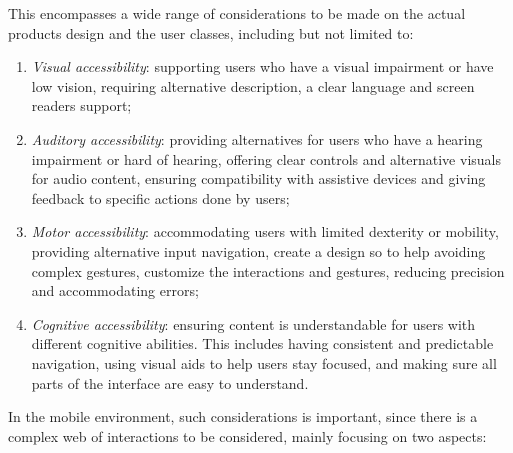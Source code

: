 This encompasses a wide range of considerations to be made on the actual products design and the user classes, including but not limited to:
\begin{enumerate}
    \item \textit{Visual accessibility}: supporting users who have a visual impairment or have low vision, requiring alternative description, a clear language and screen readers support;

    \item \textit{Auditory accessibility}: providing alternatives for users who have a hearing impairment or hard of hearing, offering clear controls and alternative  visuals for audio content, ensuring compatibility with assistive devices and giving feedback to specific actions done by users;

    \item \textit{Motor accessibility}: accommodating users with limited dexterity or mobility, providing alternative input navigation, create a design so to help avoiding complex gestures, customize the interactions and gestures, reducing precision and accommodating errors;

    \item \textit{Cognitive accessibility}: ensuring content is understandable for users with different cognitive abilities. This includes having consistent and predictable navigation, using visual aids to help users stay focused, and making sure all parts of the interface are easy to understand.
    
\end{enumerate}

In the mobile environment, such considerations is important, since there is a complex web of interactions to be considered, mainly focusing on two aspects:

